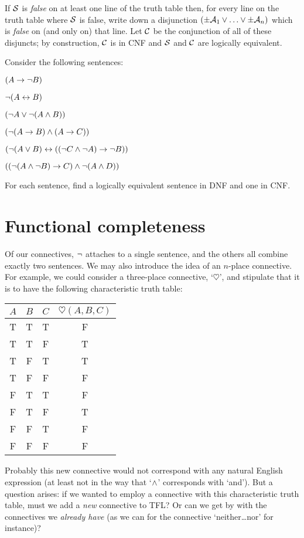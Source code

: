	If $\mathcal{S}$ is \emph{false} on at least one line of the truth table then, for every line on the truth table where $\mathcal{S}$ is false, write down a disjunction $(\pm\mathcal{A}_1 \vee \ldots \vee \pm\mathcal{A}_n)$ which is \emph{false} on (and only on) that line. Let $\mathcal{C}$ be the conjunction of all of these disjuncts; by construction, $\mathcal{C}$ is in CNF and $\mathcal{S}$ and $\mathcal{C}$ are logically equivalent.

\practiceproblems
\problempart
\label{pr.DNF}
Consider the following sentences:
	\begin{earg}
		\item $(A \rightarrow \neg B)$
		\item $\neg (A \leftrightarrow B)$
		\item $(\neg A \vee \neg (A \wedge B))$
		\item $(\neg (A \rightarrow B ) \wedge (A \rightarrow C))$
		\item $(\neg (A \vee B) \leftrightarrow ((\neg C \wedge \neg A) \rightarrow \neg B))$
		\item $((\neg (A \wedge \neg B) \rightarrow C) \wedge \neg (A \wedge D))$
	\end{earg}
        For each sentence, find a logically equivalent sentence in DNF and one in CNF.

\chapter{Functional completeness}

Of our connectives, $\neg$ attaches to a single sentence, and the others all combine exactly two sentences. We may also introduce the idea of an $n$-place connective. For example, we could consider a three-place connective, `$\heartsuit$', and stipulate that it is to have the following characteristic truth table:
\begin{center}
\begin{tabular}{c c c | c}
$A$ & $B$ & $C$ & $\heartsuit(A,B,C)$\\
\hline
 T & T & T & F \\
 T & T & F & T \\
 T & F & T & T \\
 T & F & F & F \\
 F & T & T & F \\
 F & T & F & T \\
 F & F & T & F \\
 F & F & F & F
\end{tabular}
\end{center}
Probably this new connective would not correspond with any natural English expression (at least not in the way that `$\wedge$' corresponds with `and'). But a question arises: if we wanted to employ a connective with this characteristic truth table, must we add a \emph{new} connective to TFL? Or can we get by with the connectives we \emph{already have} (as we can for the connective `neither\dots nor' for instance)?

